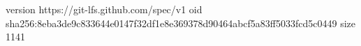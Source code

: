 version https://git-lfs.github.com/spec/v1
oid sha256:8eba3de9c833644e0147f32df1e8e369378d90464abcf5a83ff5033fcd5c0449
size 1141
